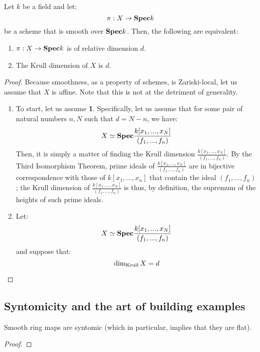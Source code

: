                 \begin{proposition} \label{prop: dimensions_of_smoothn_morphisms_over_fields}
                    Let $k$ be a field and let:
                        $$\pi: X \to \mathbf{Spec} k$$
                    be a scheme that is smooth over $\mathbf{Spec} k$. Then, the following are equivalent:
                        \begin{enumerate}
                            \item $\pi: X \to \mathbf{Spec} k$ is of relative dimension $d$. 
                            \item The Krull dimension of $X$ is $d$. 
                        \end{enumerate}
                \end{proposition}
                    \begin{proof}
                        Because smoothness, as a property of schemes, is Zariski-local, let us assume that $X$ is affine. Note that this is not at the detriment of generality. 
                        \begin{enumerate}
                            \item To start, let us assume \textbf{1}. Specifically, let us assume that for some pair of natural numbers $n, N$ such that $d = N - n$, we have:
                                $$X \simeq \mathbf{Spec} \frac{k[x_1, ..., x_N]}{(f_1, ...,f_n)}$$
                            Then, it is simply a matter of finding the Krull dimension $\frac{k[x_1, ..., x_N]}{(f_1, ...,f_n)}$. By the Third Isomorphism Theorem, prime ideals of $\frac{k[x_1, ..., x_N]}{(f_1, ...,f_n)}$ are in bijective correspondence with those of $k[x_1, ..., x_n]$ that contain the ideal $(f_1, ..., f_n)$; the Krull dimension of $\frac{k[x_1, ..., x_N]}{(f_1, ...,f_n)}$ is thus, by definition, the supremum of the heights of such prime ideals. 
                            \item Let:
                                $$X \simeq \mathbf{Spec} \frac{k[x_1, ..., x_N]}{(f_1, ..., f_n)}$$
                            and suppose that:
                                $$\dim_{\mathrm{Krull}} X = d$$
                            
                        \end{enumerate}
                    \end{proof}
        
        \subsection{Syntomicity and the art of building examples}
            \begin{proposition} \label{prop: smooth_maps_are_syntomic}
                Smooth ring maps are syntomic (which in particular, implies that they are flat).
            \end{proposition}
                \begin{proof}
                    
                \end{proof}
     

